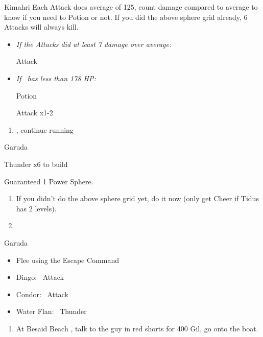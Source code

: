 \begin{battle}[750]{Kimahri}
    Each Attack does average of 125, count damage compared to average to know if you need to Potion or not.
    If you did the above sphere grid already, 6 Attacks will always kill.
    \begin{itemize}
        \tidusf Attack x5
        \item \textit{If the Attacks did at least 7 damage over average:}
        \begin{itemize}
            \tidusf Attack
        \end{itemize}
        \item \textit{If \tidus\ has less than 178 HP:}
        \begin{itemize}
            \tidusf Potion
        \end{itemize}
        \tidusf Attack x1-2
    \end{itemize}
\end{battle}
\begin{enumerate}[resume]
    \item \sd, continue running
\end{enumerate}
\begin{battle}{Garuda}
    \begin{itemize}
        \summon{\valefor}
        \valeforf Thunder x6 to build \od
    \end{itemize}
    Guaranteed 1 Power Sphere.
\end{battle}
\begin{enumerate}[resume]
    \item If you didn't do the above sphere grid yet, do it now (only get Cheer if Tidus has 2 levels).
    \item \formation{\tidus}{\yuna}{\lulu}
\end{enumerate}
\begin{battle}{Garuda}
    \begin{itemize}
        \item Flee using the Escape Command
    \end{itemize}
\end{battle}
\begin{encounters}
    \begin{itemize}
        \item Dingo: \tidus\ Attack
        \item Condor: \wakka\ Attack
        \item Water Flan: \lulu\ Thunder
    \end{itemize}
\end{encounters}
\begin{enumerate}[resume]
    \item At Besaid Beach \save, talk to the guy in red shorts for 400 Gil, go onto the boat.
\end{enumerate}